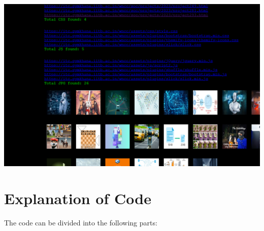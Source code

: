 \documentclass{article}
\begin{document}
\includegraphics[scale=0.4]{qq (4).png}

\newpage

\section{Explanation of Code}
The code can be divided into the following parts:
\end{document}

